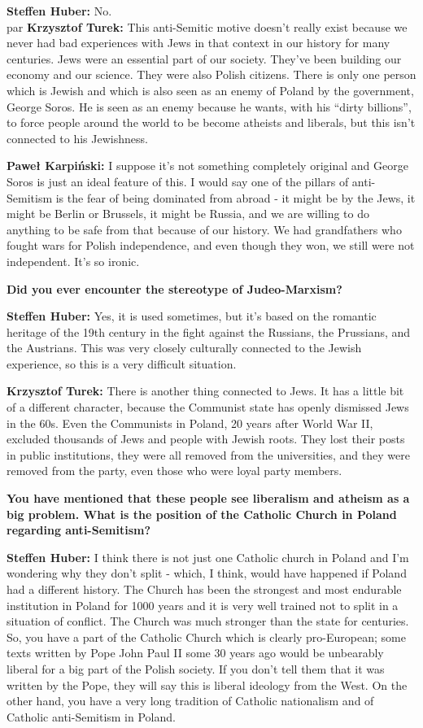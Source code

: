 \textbf{Steffen Huber:} No.\\par
\textbf{Krzysztof Turek:} This anti-Semitic motive doesn’t really exist because we never had bad experiences with Jews in that context in our history for many centuries. Jews were an essential part of our society. They've been building our economy and our science. They were also Polish citizens. There is only one person which is Jewish and which is also seen as an enemy of Poland by the government, George Soros. He is seen as an enemy because he wants, with his “dirty billions”, to force people around the world to be become atheists and liberals, but this isn’t connected to his Jewishness.\par
\textbf{Paweł Karpiński:} I suppose it's not something completely original and George Soros is just an ideal feature of this. I would say one of the pillars of anti-Semitism is the fear of being dominated from abroad - it might be by the Jews, it might be Berlin or Brussels, it might be Russia, and we are willing to do anything to be safe from that because of our history. We had grandfathers who fought wars for Polish independence, and even though they won, we still were not independent. It's so ironic.  

\textbf{Did you ever encounter the stereotype of Judeo-Marxism?} 

\textbf{Steffen Huber:} Yes, it is used sometimes, but it's based on the romantic heritage of the 19th century in the fight against the Russians, the Prussians, and the Austrians. This was very closely culturally connected to the Jewish experience, so this is a very difficult situation.\par
\textbf{Krzysztof Turek:} There is another thing connected to Jews. It has a little bit of a different character, because the Communist state has openly dismissed Jews in the 60s. Even the Communists in Poland, 20 years after World War II, excluded thousands of Jews and people with Jewish roots. They lost their posts in public institutions, they were all removed from the universities, and they were removed from the party, even those who were loyal party members. 

\textbf{You have mentioned that these people see liberalism and atheism as a big problem. What is the position of the Catholic Church in Poland regarding anti-Semitism?} 

\textbf{Steffen Huber:} I think there is not just one Catholic church in Poland and I'm wondering why they don't split - which, I think, would have happened if Poland had a different history. The Church has been the strongest and most endurable institution in Poland for 1000 years and it is very well trained not to split in a situation of conflict. The Church was much stronger than the state for centuries. So, you have a part of the Catholic Church which is clearly pro-European; some texts written by Pope John Paul II some 30 years ago would be unbearably liberal for a big part of the Polish society. If you don't tell them that it was written by the Pope, they will say this is liberal ideology from the West. On the other hand, you have a very long tradition of Catholic nationalism and of Catholic anti-Semitism in Poland. 


